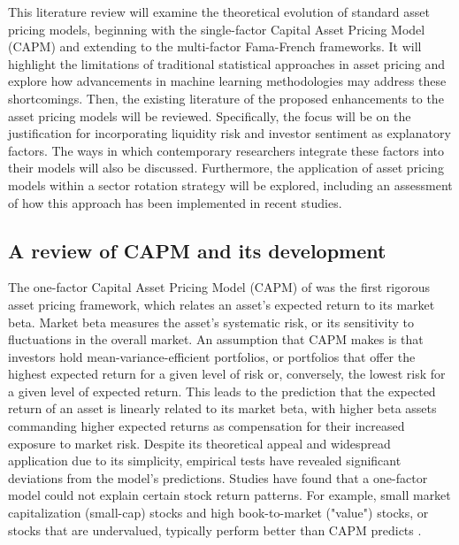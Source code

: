 This literature review will examine the theoretical evolution of standard asset pricing models, beginning with the single-factor Capital Asset Pricing Model (CAPM) and extending to the multi-factor Fama-French frameworks. It will highlight the limitations of traditional statistical approaches in asset pricing and explore how advancements in machine learning methodologies may address these shortcomings. Then, the existing literature of the proposed enhancements to the asset pricing models will be reviewed. Specifically, the focus will be on the justification for incorporating liquidity risk and investor sentiment as explanatory factors. The ways in which contemporary researchers integrate these factors into their models will also be discussed. Furthermore, the application of asset pricing models within a sector rotation strategy will be explored, including an assessment of how this approach has been implemented in recent studies.


\subsection{A review of CAPM and its development}

The one-factor Capital Asset Pricing Model (CAPM) of  was the first rigorous asset pricing framework, which relates an asset's expected return to its market beta. Market beta measures the asset's systematic risk, or its sensitivity to fluctuations in the overall market. An assumption that CAPM makes is that investors hold mean-variance-efficient portfolios, or portfolios that offer the highest expected return for a given level of risk or, conversely, the lowest risk for a given level of expected return. This leads to the prediction that the expected return of an asset is linearly related to its market beta, with higher beta assets commanding higher expected returns as compensation for their increased exposure to market risk. Despite its theoretical appeal and widespread application due to its simplicity, empirical tests have revealed significant deviations from the model's predictions. Studies have found that a one-factor model could not explain certain stock return patterns. For example, small market capitalization (small-cap) stocks and high book-to-market ("value") stocks, or stocks that are undervalued, typically perform better than CAPM predicts \cite{capm_2004}.

